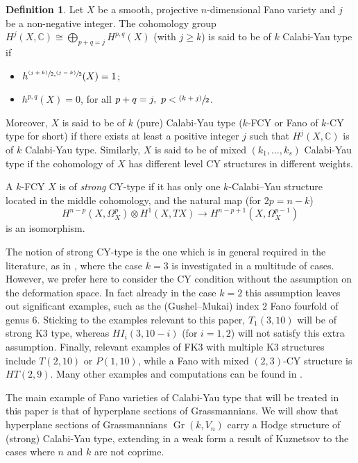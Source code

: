 \documentclass[11pt]{article}
\newcommand{\psfrac}[2]{\sfrac{(#1)}{#2}}
\theoremstyle{plain}
\theoremstyle{definition}
\newtheorem{defin}[theorem]{Definition}
\DeclareMathOperator{\Gr}{Gr}
\newcommand{\CC}{\mathbb{C}}
\begin{document}
\begin{defin}\label{def:CYtype}
Let $X$ be a smooth, projective $n$-dimensional Fano variety and $j$ be a non-negative integer. The cohomology group $H^j(X, \CC) \cong \bigoplus_{p+q=j} H^{p,q}(X)$ (with $j \geq k$) is said to be of $k$ Calabi-Yau type if
\begin{itemize}
\item $h^{\psfrac{j+k}{2},\psfrac{j-k}{2}}(X)=1$;
\item $h^{p,q}(X)=0$, for all $p+q=j, \ p <\psfrac{k+j}{2}$.
\end{itemize}
Moreover, $X$ is said to be of $k$ (pure) Calabi-Yau type ($k$-FCY or Fano of $k$-CY type for short) if there exists at least a positive integer $j$ such that $H^j(X, \CC)$ is of $k$ Calabi-Yau type. Similarly, $X$ is said to be of mixed $(k_1, \ldots, k_s)$ Calabi-Yau type if the cohomology of $X$ has different level CY structures in different weights.

A $k$-FCY $X$ is of \emph{strong} CY-type if it has only one $k$-Calabi--Yau structure located in the middle cohomology, and the natural map (for $2p=n-k$)
\[
H^{n-p}(X,\Omega_X^p)\otimes H^1(X,TX)\to H^{n-p+1}(X,\Omega_X^{p-1})
\]
is an isomorphism.
\end{defin}

The notion of strong CY-type is the one which is in general required in the literature, as
in \cite{imcy}, where the case $k=3$ is investigated in a multitude of cases. However, we prefer here to consider the CY condition without the assumption on the deformation space.
In fact already in the case $k=2$ this assumption leaves out significant examples, such as the (Gushel--Mukai) index $2$ Fano fourfold of genus $6$.
Sticking to the examples relevant to this paper, $T_1(3,10)$ will be of strong K3 type, whereas $HI_i(3,10-i)$ (for $i=1,2$) will not satisfy this extra assumption. Finally, relevant examples of FK3 with multiple K3 structures include $T(2,10)$ or $P(1,10)$, while a Fano with mixed $(2,3)$-CY structure is $HT(2,9)$. Many other examples and computations can be found in \cite{fm}.

The main example of Fano varieties of Calabi-Yau type that will be treated in this paper is that
of hyperplane sections of Grassmannians.
We will show that hyperplane sections of Grassmannians $\Gr(k,V_n)$ carry a Hodge structure of (strong) Calabi-Yau type, extending in a weak form a result of Kuznetsov to the cases where $n$ and $k$ are not coprime.
\end{document}
